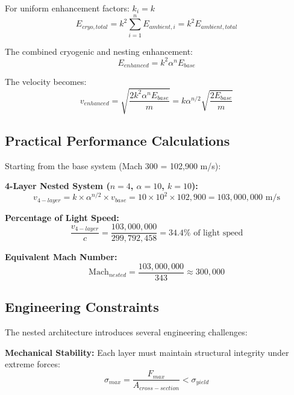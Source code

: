 \documentclass[12pt,a4paper]{article}
\begin{document}
For uniform enhancement factors: $k_i = k$
\begin{equation}
E_{cryo,total} = k^2 \sum_{i=1}^{n} E_{ambient,i} = k^2 E_{ambient,total}
\end{equation}

The combined cryogenic and nesting enhancement:
\begin{equation}
E_{enhanced} = k^2 \alpha^n E_{base}
\end{equation}

The velocity becomes:
\begin{equation}
v_{enhanced} = \sqrt{\frac{2k^2\alpha^n E_{base}}{m}} = k\alpha^{n/2}\sqrt{\frac{2E_{base}}{m}}
\end{equation}

\subsection{Practical Performance Calculations}

Starting from the base system (Mach 300 = 102,900 m/s):

\textbf{4-Layer Nested System ($n=4$, $\alpha=10$, $k=10$):}
\begin{equation}
v_{4-layer} = k \times \alpha^{n/2} \times v_{base} = 10 \times 10^2 \times 102,900 = 103,000,000 \text{ m/s}
\end{equation}

\textbf{Percentage of Light Speed:}
\begin{equation}
\frac{v_{4-layer}}{c} = \frac{103,000,000}{299,792,458} = 34.4\% \text{ of light speed}
\end{equation}

\textbf{Equivalent Mach Number:}
\begin{equation}
\text{Mach}_{nested} = \frac{103,000,000}{343} \approx 300,000
\end{equation}

\subsection{Engineering Constraints}

The nested architecture introduces several engineering challenges:

\textbf{Mechanical Stability:}
Each layer must maintain structural integrity under extreme forces:
\begin{equation}
\sigma_{max} = \frac{F_{max}}{A_{cross-section}} < \sigma_{yield}
\end{equation}
\end{document}
